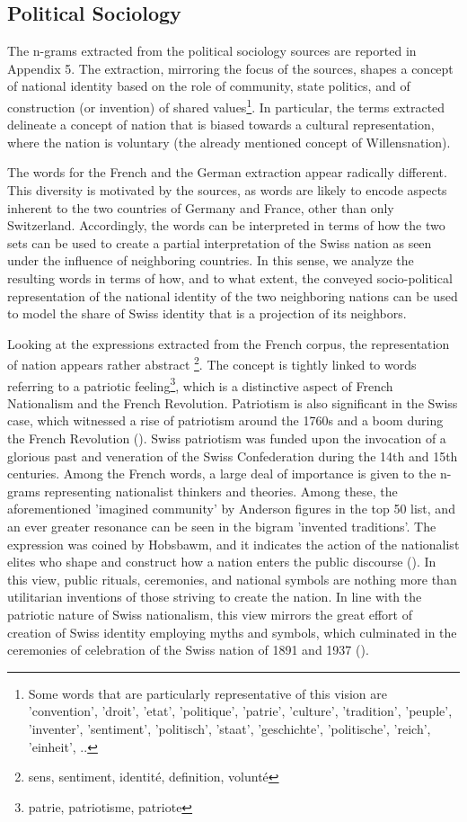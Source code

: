 \documentclass[11pt]{article}
\begin{document}
\subsection{Political Sociology}
The n-grams extracted from the political sociology sources are reported in Appendix 5. The extraction, mirroring the focus of the sources, shapes a concept of national identity based on the role of community, state politics, and of construction (or invention) of shared values\footnote{Some words that are particularly representative of this vision are 'convention', 'droit', 'etat',  'politique', 'patrie', 'culture', 'tradition', 'peuple', 'inventer', 'sentiment',  'politisch', 'staat', 'geschichte', 'politische', 'reich', 'einheit', ..}. In particular, the terms extracted delineate a concept of nation that is biased towards a cultural representation, where the nation is voluntary (the already mentioned concept of Willensnation). \par
The words for the French and the German extraction appear radically different. This diversity is motivated by the sources, as words are likely to encode aspects inherent to the two countries of Germany and France, other than only Switzerland. Accordingly, the words can be interpreted in terms of how the two sets can be used to create a partial interpretation of the Swiss nation as seen under the influence of neighboring countries. In this sense, we analyze the resulting words in terms of how, and to what extent, the conveyed socio-political representation of the national identity of the two neighboring nations can be used to model the share of Swiss identity that is a projection of its neighbors. \par
Looking at the expressions extracted from the French corpus, the representation of nation appears rather abstract \footnote{sens, sentiment, identité, definition, volunté}. The concept is tightly linked to words referring to a patriotic feeling\footnote{patrie, patriotisme, patriote}, which is a distinctive aspect of French Nationalism and the French Revolution. Patriotism is also significant in the Swiss case, which witnessed a rise of patriotism around the 1760s and a boom during the French Revolution (\citep{zimmer1999forging}). Swiss patriotism was funded upon the invocation of a glorious past and veneration of the Swiss Confederation during the 14th and 15th centuries. Among the French words, a large deal of importance is given to the n-grams representing nationalist thinkers and theories. Among these, the aforementioned 'imagined community' by Anderson figures in the top 50 list, and an ever greater resonance can be seen in the bigram 'invented traditions'. The expression was coined by Hobsbawm, and it indicates the action of the nationalist elites who shape and construct how a nation enters the public discourse (\citep{anderson2006imagined, hobsbawm2012invention}). In this view, public rituals, ceremonies, and national symbols are nothing more than utilitarian inventions of those striving to create the nation. In line with the patriotic nature of Swiss nationalism, this view mirrors the great effort of creation of Swiss identity employing myths and symbols, which culminated in the ceremonies of celebration of the Swiss nation of 1891 and 1937 (\citep{zimmer1999forging, wimmer2011swiss}). \par
\end{document}
